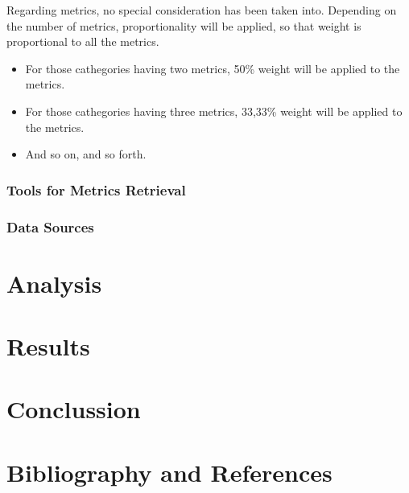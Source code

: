 \documentclass[11pt]{article}
\begin{document}
Regarding metrics, no special consideration has been taken into. Depending on the number of metrics, proportionality will be applied, so that weight is proportional to all the metrics. 
\begin{itemize}\itemsep0pt
\item{For those cathegories having two metrics, 50\% weight will be applied to the metrics.}
\item{For those cathegories having three metrics, 33,33\% weight will be applied to the metrics.}
\item{And so on, and so forth.}
\end{itemize}

\subsubsection{Tools for Metrics Retrieval}

\subsubsection{Data Sources}

\section{Analysis} \label{sec:analysis}

\section{Results} \label{sec:results}

\section{Conclussion} \label{sec:conclussion}

\section{Bibliography and References} \label{sec:bibliography}

{}
\end{document}

